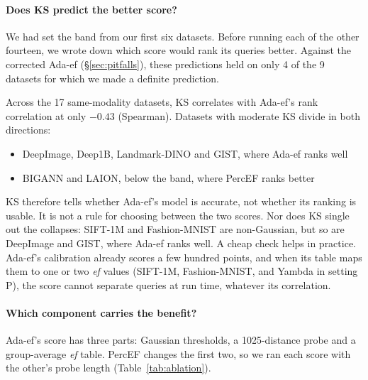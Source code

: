 \documentclass[sigconf, nonacm]{acmart}
\newcommand{\ef}{\textit{ef}}
\begin{document}
\paragraph{Does KS predict the better score?}\label{sec:predict}
We had set the band from our first six datasets. Before running each of the other fourteen, we wrote
down which score would rank its queries better. Against the corrected Ada-ef (\S\ref{sec:pitfalls}),
these predictions held on only 4 of the 9 datasets for which we made a definite prediction.

Across the 17 same-modality datasets, KS correlates with Ada-ef's rank correlation at only $-0.43$
(Spearman). Datasets with moderate KS divide in both directions:
\begin{itemize}
\item DeepImage, Deep1B, Landmark-DINO and GIST, where Ada-ef ranks well
\item BIGANN and LAION, below the band, where PercEF ranks better
\end{itemize}
KS therefore tells whether Ada-ef's model is accurate, not whether its ranking is usable. It is not
a rule for choosing between the two scores. Nor does KS single out the collapses: SIFT-1M and
Fashion-MNIST are non-Gaussian, but so are DeepImage and GIST, where Ada-ef ranks well. A cheap
check helps in practice. Ada-ef's calibration already scores a few hundred points, and when its
table maps them to one or two \ef{} values (SIFT-1M, Fashion-MNIST, and Yambda in setting P), the
score cannot separate queries at run time, whatever its correlation.

\paragraph{Which component carries the benefit?}\label{sec:ablation}
Ada-ef's score has three parts: Gaussian thresholds, a 1025-distance probe and a group-average \ef{}
table. PercEF changes the first two, so we ran each score with the other's probe length
(Table~\ref{tab:ablation}).
\end{document}
